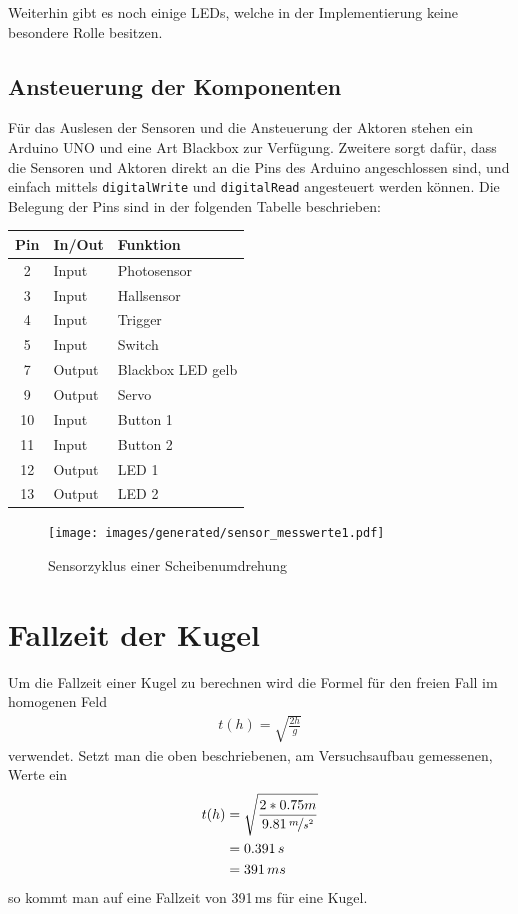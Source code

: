Weiterhin gibt es noch einige LEDs, welche in der Implementierung keine besondere Rolle besitzen.

\subsection{Ansteuerung der Komponenten}
Für das Auslesen der Sensoren und die Ansteuerung der Aktoren stehen ein Arduino UNO und eine Art Blackbox zur Verfügung.
Zweitere sorgt dafür, dass die Sensoren und Aktoren direkt an die Pins des Arduino angeschlossen sind, und einfach mittels \texttt{digitalWrite} und \texttt{digitalRead} angesteuert werden können.
Die Belegung der Pins sind in der folgenden Tabelle beschrieben:


\begin{center}
\begin{tabular}{cll} 
	\textbf{Pin} 	& \textbf{In/Out} & \textbf{Funktion}	\\
	\toprule
	2 &	Input &	Photosensor \\
	3 &	Input &	Hallsensor\\
	4 &	Input &	Trigger\\
	5 &	Input &	Switch\\
	7 &	Output &	Blackbox LED gelb\\
	9 &	Output &	Servo\\
	10 &	Input &	Button 1\\
	11 &	Input &	Button 2\\
	12 &	Output &	LED 1\\
	13 &	Output &	LED 2\\
	\bottomrule
\end{tabular}
\end{center}

\begin{figure}[h] \centering
	\texttt{[image: images/generated/sensor\_messwerte1.pdf]}
	\caption{Sensorzyklus einer Scheibenumdrehung}
	\label{img:sensorwerte}
\end{figure}

\section{Fallzeit der Kugel}
Um die Fallzeit einer Kugel zu berechnen wird die Formel für den freien Fall im homogenen Feld
\begin{align}
	t(h) = \sqrt{\frac{2h}{g}}
\end{align}
verwendet.
Setzt man die oben beschriebenen, am Versuchsaufbau gemessenen, Werte ein
\begin{align}
t(h) &= \sqrt{\frac{2 * 0.75m}{9.81\,\nicefrac{m}{s^2}}} \\
	 &= 0.391\,s \\
	 &= 391\,ms
\end{align}
so kommt man auf eine Fallzeit von 391\,ms für eine Kugel.


